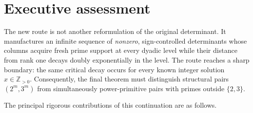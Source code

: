 \documentclass[11pt]{article}
\theoremstyle{definition}
\newcommand{\Z}{\mathbb Z}
\begin{document}
\tableofcontents
\newpage

\section{Executive assessment}

\begin{aeexecutivebox}
The new route is not another reformulation of the original determinant.  It manufactures
an infinite sequence of \emph{nonzero}, sign-controlled determinants whose columns acquire
fresh prime support at every dyadic level while their distance from rank one decays doubly
exponentially in the level.  The route reaches a sharp boundary: the same critical decay
occurs for every known integer solution $x\in\Z_{>0}$.  Consequently, the final theorem
must distinguish structural pairs $(2^m,3^m)$ from simultaneously power-primitive
pairs with primes outside $\{2,3\}$.
\end{aeexecutivebox}

The principal rigorous contributions of this continuation are as follows.
\end{document}
